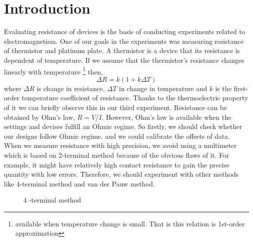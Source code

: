 \documentclass[5p,sort&compress]{elsarticle}
\begin{document}
\section{Introduction} \label{introduction}
Evaluating resistance of devices is the basis of conducting experiments related to electromagnetism.
One of our goals in the experiments was measuring resistance of thermistor and platinum plate. 
A thermistor is a device that its resistance is dependent of temperature. If we assume that the thermistor’s resistance changes linearly with temperature \footnote {available when temperature change is small. That is this relation is 1st-order approximation} then,							
\begin{equation} \label{eq1}
    {\Delta}R= k(1+k{\Delta}T)
\end{equation}
where ${\Delta} R$ is change in resistance, ${\Delta} T$ in change in temperature and $k$ is the first-order temperature coefficient of resistance. Thanks to the thermoelectric property of it we can briefly observe this in our third experiment.  
\newline
Resistance can be obtained by Ohm’s law, $R = V/I$. However, Ohm’s law is available when the settings and devises fulfill an Ohmic regime. So firstly, we should check whether our designs follow Ohmic regime. and we could calibrate the offsets of data. When we measure resistance with high precision, we avoid using a multimeter which is based on 2-terminal method because of the obvious flaws of it. For example, it might have relatively high contact resistance to gain the precise quantity with low errors. Therefore, we should experiment with other methods like 4-terminal method and van der Pauw method.  
\newline
\begin{figure}[h]
\centering
    
    \caption{4 -terminal method}
    \label{fig:exp1circuit}
\end{figure}
\end{document}
